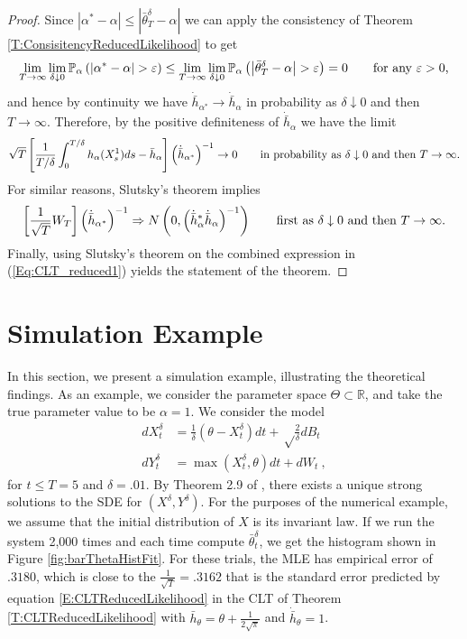 \documentclass{article}
\begin{document}
\begin{proof}
Since $|\alpha^{*}-\alpha|\leq |\bar{\theta}^{\delta}_{T}-\alpha|$ we can apply the consistency of Theorem \ref{T:ConsisitencyReducedLikelihood} to get
\[\lim_{T\rightarrow\infty}\lim_{\delta\downarrow 0}\mathbb{P}_{\alpha}\left(\left|\alpha^*-\alpha\right|>\varepsilon\right)\leq \lim_{T\rightarrow\infty}\lim_{\delta\downarrow 0}\mathbb{P}_{\alpha}\left(\left|\bar\theta_T^\delta-\alpha\right|>\varepsilon\right)=0\qquad\hbox{for any $\varepsilon>0$,}\]
and hence by continuity we have $\dot{\bar{h}}_{\alpha^*}\rightarrow\dot{\bar{h}}_{\alpha}$ in probability as $\delta\downarrow 0$ and then $T\rightarrow\infty$.  Therefore,  by the positive definiteness of $\dot{\bar{h}}_{\alpha}$ we have the limit
\[
\sqrt{T}\left[\frac{1}{T/\delta}\int_{0}^{T/\delta}h_{\alpha}(X^{1}_{s})ds-\bar{h}_{\alpha}\right]\left(\dot{\bar{h}}_{\alpha^{*}}\right)^{-1} \rightarrow 0\qquad\hbox{in probability as $\delta\downarrow0$ and then $T\rightarrow\infty$.}
\]
For similar reasons, Slutsky's theorem implies
\[
\left[\frac{1}{\sqrt{T}}W_{T} \right]\left(\dot{\bar{h}}_{\alpha^{*}}\right)^{-1} \Rightarrow N\left(0,\left(\dot{\bar{h}}^{*}_{\alpha}\dot{\bar{h}}_{\alpha}\right)^{-1}\right)\qquad\hbox{first as $\delta\downarrow 0$ and then $T\rightarrow\infty$.}
\]
Finally, using Slutsky's theorem on the combined expression in (\ref{Eq:CLT_reduced1}) yields the statement of the theorem.
\end{proof}



\section{Simulation Example}\label{SS:simExample}
In this section, we present a simulation example, illustrating the theoretical findings. As an example, we consider the parameter space $\Theta\subset\mathbb R$, and take the true parameter value to be $\alpha=1$. We consider the model
\begin{align}
\nonumber
dX_t^\delta&=\frac 1\delta\left(\theta-X_t^\delta\right)dt+\sqrt\frac{2}{\delta}dB_t\\
dY_t^\delta&=\max(X_t^\delta,\theta)dt+dW_t\ ,
\label{E:simModel}
\end{align}
for $t\leq T= 5$ and $\delta = .01$. By Theorem 2.9 of \cite{KaratzasShreve}, there exists a unique strong solutions to the SDE for $(X^\delta,Y^\delta)$. For the purposes of the numerical example, we assume that the initial distribution of $X$ is its invariant law. If we run the system 2,000 times and each time compute $\bar \theta_t^\delta$, we get the histogram shown in Figure \ref{fig:barThetaHistFit}. For these trials, the MLE has empirical error of $.3180$, which is close to the $\frac{1}{\sqrt T}=.3162$ that is the standard error predicted by equation \eqref{E:CLTReducedLikelihood} in the CLT of Theorem \ref{T:CLTReducedLikelihood} with $\bar h_{\theta} = \theta+\frac{1}{2\sqrt\pi}$ and $\dot{\bar h}_{\theta} = 1$.
\end{document}
